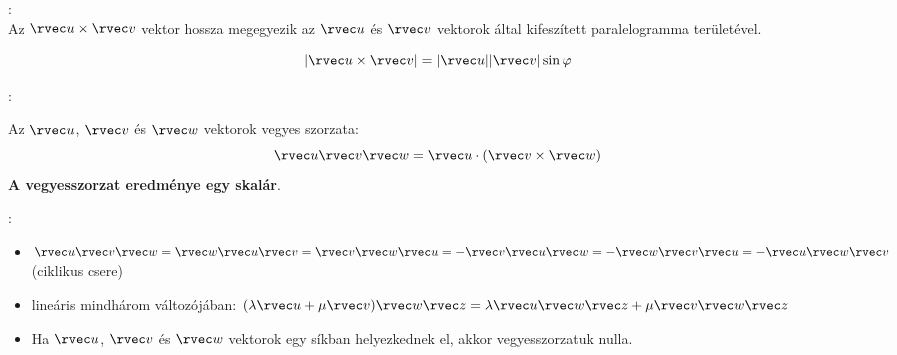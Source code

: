 \documentclass[a4paper, 12pt]{scrartcl}
\begin{document}
\begin{note}
  \begin{minipage}{.6\textwidth}
    :\\[1mm]
    Az $\rvec u \times \rvec v$ vektor hossza megegyezik az $\rvec u$ és $\rvec v$
    vektorok által kifeszített paralelogramma területével.

    \[
      |\rvec u \times \rvec v| = |\rvec u| |\rvec v| \sin \varphi
    \]
  \end{minipage}\begin{minipage}{.4\textwidth}
    \centering
  \end{minipage}
\end{note}

\begin{blueBox}
  :

  Az $\rvec u$, $\rvec v$ és $\rvec w$ vektorok vegyes szorzata:
  \[
    \rvec u \rvec v \rvec w
    = \rvec u \cdot (\rvec v \times \rvec w)
  \]
  \textbf{A vegyesszorzat eredménye egy skalár}.
\end{blueBox}

\begin{note}
  :
  \begin{itemize}
    \item $\rvec u \rvec v \rvec w
            = \rvec w \rvec u \rvec v
            = \rvec v \rvec w \rvec u
            = -\rvec v \rvec u \rvec w
            = -\rvec w \rvec v \rvec u
            = -\rvec u \rvec w \rvec v$
          (ciklikus csere)

    \item lineáris mindhárom változójában:
          $(\lambda \rvec u + \mu \rvec v) \rvec w \rvec z
            = \lambda \rvec u \rvec w \rvec z + \mu \rvec v \rvec w \rvec z$

    \item Ha $\rvec u$, $\rvec v$ és $\rvec w$ vektorok egy síkban helyezkednek
          el, akkor vegyesszorzatuk nulla.
  \end{itemize}
\end{note}
\end{document}
